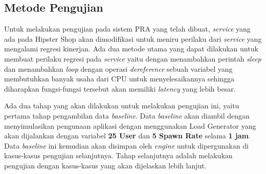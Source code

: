 \subsection{Metode Pengujian}
\label{metode-pengujian}
Untuk melakukan pengujian pada sistem PRA yang telah dibuat, \textit{service} yang ada pada Hipster Shop akan dimodifikasi untuk meniru perilaku dari \textit{service} yang mengalami regresi kinerjan. Ada dua metode utama yang dapat dilakukan untuk membuat perilaku regresi pada \textit{service} yaitu dengan menambahkan perintah \textit{sleep} dan menambahkan \textit{loop} dengan operasi \textit{dereference} sebuah variabel yang membutuhkan banyak usaha dari CPU untuk menyelesaikannya sehingga diharapkan fungsi-fungsi tersebut akan memiliki \textit{latency} yang lebih besar. 

Ada dua tahap yang akan dilakukan untuk melakukan pengujian ini, yaitu pertama tahap pengambilan data \textit{baseline}. Data \textit{baseline} akan diambil dengan menyimulasikan pengunaan aplikasi dengan menggunakan Load Generator yang akan dijalankan dengan variabel \textbf{25 User} dan \textbf{5 Spawn Rate} selama \textbf{1 jam}. Data \textit{baseline} ini kemudian akan disimpan oleh \textit{engine} untuk dipergunakan di kasus-kasus pengujian selanjutnya. Tahap selanjutnya adalah melakukan pengujian dengan kasus-kasus yang akan dijelaskan lebih lanjut.

